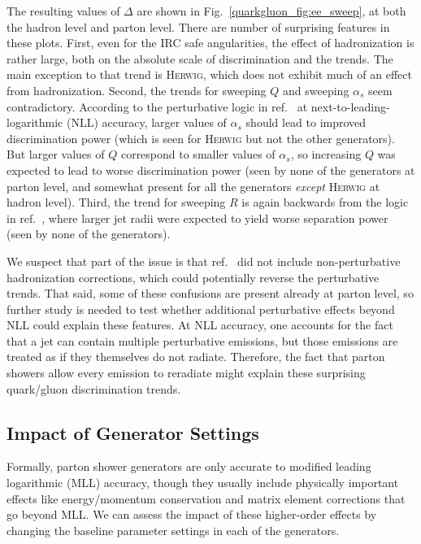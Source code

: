 \documentclass[11pt]{cernrep}
\begin{document}
The resulting values of $\Delta$ are shown in Fig.~\ref{quarkgluon_fig:ee_sweep}, at both the hadron level and parton level.   There are number of surprising features in these plots.  First, even for the IRC safe angularities, the effect of hadronization is rather large, both on the absolute scale of discrimination and the trends.  The main exception to that trend is \textsc{Herwig}, which does not exhibit much of an effect from hadronization.  Second, the trends for sweeping $Q$ and sweeping $\alpha_s$  seem contradictory.  According to the perturbative logic in ref.~\cite{Larkoski:2013eya} at next-to-leading-logarithmic (NLL) accuracy, larger values of $\alpha_s$ should lead to improved discrimination power (which is seen for \textsc{Herwig} but not the other generators).  But larger values of $Q$ correspond to smaller values of $\alpha_s$, so increasing $Q$ was expected to lead to worse discrimination power (seen by none of the generators at parton level, and somewhat present for all the generators \emph{except} \textsc{Herwig} at hadron level).  Third, the trend for sweeping $R$ is again backwards from the logic in ref.~\cite{Larkoski:2013eya}, where larger jet radii were expected to yield worse separation power (seen by none of the generators).

We suspect that part of the issue is that ref.~\cite{Larkoski:2013eya} did not include non-perturbative hadronization corrections, which could potentially reverse the perturbative trends.  That said, some of these confusions are present already at parton level, so further study is needed to test whether additional perturbative effects beyond NLL could explain these features.  At NLL accuracy, one accounts for the fact that a jet can contain multiple perturbative emissions, but those emissions are treated as if they themselves do not radiate.  Therefore, the fact that parton showers allow every emission to reradiate might explain these surprising quark/gluon discrimination trends.

\subsection{Impact of Generator Settings}
\label{quarkgluon_sec:ee_settings}

Formally, parton shower generators are only accurate to modified leading logarithmic (MLL) accuracy, though they usually include physically important effects like energy/momentum conservation and matrix element corrections that go beyond MLL.  We can assess the impact of these higher-order effects by changing the baseline parameter settings in each of the generators.  
\end{document}
